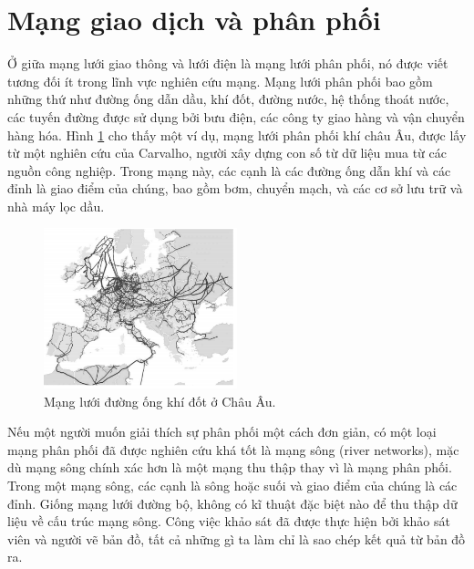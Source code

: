 \section{Mạng giao dịch và phân phối}
Ở giữa mạng lưới giao thông và lưới điện là mạng lưới phân phối, nó được viết tương đối ít trong lĩnh vực nghiên cứu mạng. Mạng lưới phân phối bao gồm những thứ như đường ống dẫn dầu, khí đốt, đường nước, hệ thống thoát nước, các tuyến đường được sử dụng bởi bưu điện, các công ty giao hàng và vận chuyển hàng hóa. Hình \ref{fig:h25} cho thấy một ví dụ, mạng lưới phân phối khí châu Âu, được lấy từ một nghiên cứu của Carvalho, người xây dựng con số từ dữ liệu mua từ các nguồn công nghiệp. Trong mạng này, các cạnh là các đường ống dẫn khí và các đỉnh là giao điểm của chúng, bao gồm bơm, chuyển mạch, và các cơ sở lưu trữ và nhà máy lọc dầu.
\begin{figure}[ht]
\centering
\includegraphics[width=0.5\textwidth]{res/h25.png}
\caption{Mạng lưới đường ống khí đốt ở Châu Âu.}
\label{fig:h25}
\end{figure}\par
Nếu một người muốn giải thích sự phân phối một cách đơn giản, có một loại mạng phân phối đã được nghiên cứu khá tốt là mạng sông (river networks), mặc dù mạng sông chính xác hơn là một mạng thu thập thay vì là mạng phân phối. Trong một mạng sông, các cạnh là sông hoặc suối và giao điểm của chúng là các đỉnh. Giống mạng lưới đường bộ, không có kĩ thuật đặc biệt nào để thu thập dữ liệu về cấu trúc mạng sông. Công việc khảo sát đã được thực hiện bởi khảo sát viên và người vẽ bản đồ, tất cả những gì ta làm chỉ là sao chép kết quả từ bản đồ ra.
